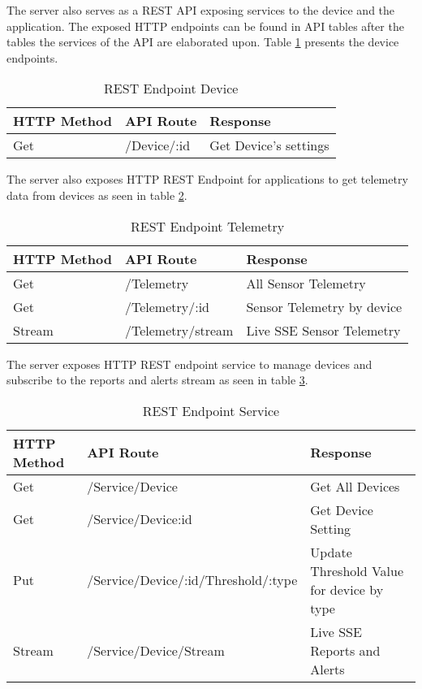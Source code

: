 The server also serves as a REST API exposing services to the device and the application. The exposed HTTP endpoints can be found in API tables after the tables the services of the API are elaborated upon. Table \ref{tbl:device} presents the device endpoints. 

\begin{table}[H]
    \centering
    \begin{tabular}{|l|l|l|}
    \hline
    \textbf{HTTP Method}    & \textbf{API Route} & \textbf{Response} \\ \hline
    Get & /Device/:id & Get Device's settings  \\ \hline
    \end{tabular}
    \caption{REST Endpoint Device}
    \label{tbl:device}
\end{table}
The server also exposes HTTP REST Endpoint for applications to get telemetry data from devices as seen in table \ref{tbl:telemetry}.

\begin{table}[H]
    \centering
    \begin{tabular}{|l|l|p{5cm}|}
    \hline
    \textbf{HTTP Method}    & \textbf{API Route} & \textbf{Response} \\ \hline
    Get & /Telemetry & All Sensor Telemetry  \\ \hline
    Get & /Telemetry/:id & Sensor Telemetry by device \\ \hline
    Stream & /Telemetry/stream & Live SSE Sensor Telemetry  \\ \hline
    \end{tabular}
    \caption{REST Endpoint Telemetry}
    \label{tbl:telemetry}
\end{table}
The server exposes HTTP REST endpoint service to manage devices and subscribe to the reports and alerts stream as seen in table \ref{tbl:service}.

    \begin{table}[H]
        \centering
        \begin{tabular}{|l|l|p{5cm}|}
        \hline
        \textbf{HTTP Method}    & \textbf{API Route} & \textbf{Response} \\ \hline
        Get & /Service/Device & Get All Devices  \\ \hline
        Get & /Service/Device:id & Get Device Setting \\ \hline
        Put & /Service/Device/:id/Threshold/:type & Update Threshold Value for device by type  \\ \hline
        Stream & /Service/Device/Stream & Live SSE Reports and Alerts \\ \hline
        \end{tabular}
        \caption{REST Endpoint Service}
        \label{tbl:service}
    \end{table}

